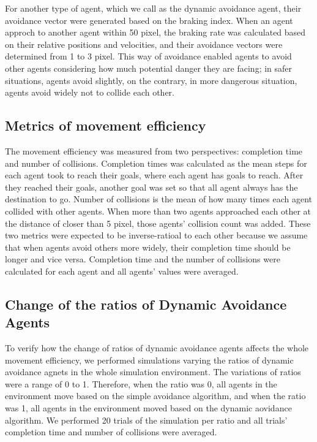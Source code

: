 \documentclass[letterpaper, 10 pt, conference]{ieeeconf}  %
\begin{document}
For another type of agent, which we call as the dynamic avoidance agent, their avoidance vector were generated based on the braking index. When an agent approch to another agent within 50 pixel, the braking rate was calculated based on their relative positions and velocities, and their avoidance vectors were determined from 1 to 3 pixel. This way of avoidance enabled agents to avoid other agents considering how much potential danger they are facing; in safer situations, agents avoid slightly, on the contrary, in more dangerous situation, agents avoid widely not to collide each other. 

\subsection{Metrics of movement efficiency}
The movement efficiency was measured from two perspectives: completion time and number of collisions. Completion times was calculated as the mean steps for each agent took to reach their goals, where each agent has goals to reach. After they reached their goals, another goal was set so that all agent always has the destination to go. Number of collisions is the mean of how many times each agent collided with other agents. When more than two agents approached each other at the distance of closer than 5 pixel, those agents' collision count was added. These two metrics were expected to be inverse-ratioal to each other because we assume that when agents avoid others more widely, their completion time should be longer and vice versa. Completion time and the number of collisions were calculated for each agent and all agents' values were averaged.

\subsection{Change of the ratios of Dynamic Avoidance Agents}
To verify how the change of ratios of dynamic avoidance agents affects the whole movement efficiency, we performed simulations varying the ratios of dynamic avoidance agnets in the whole simulation environment. The variations of ratios were a range of 0 to 1. Therefore, when the ratio was 0, all agents in the environment move based on the simple avoidance algorithm, and when the ratio was 1, all agents in the environment moved based on the dynamic aovidance algorithm. We performed 20 trials of the simulation per ratio and all trials' completion time and number of collisions were averaged.
\end{document}
